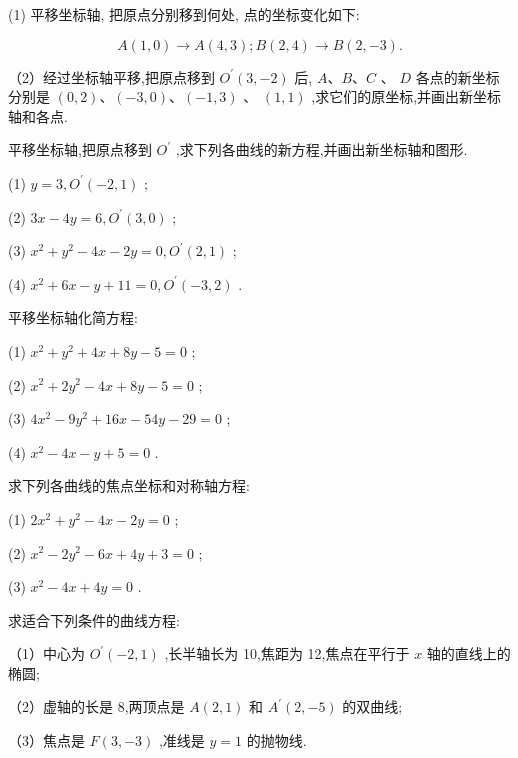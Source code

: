 \documentclass[lang=cn,newtx,10pt,scheme=chinese]{elegantbook}
\begin{document}
\begin{problemset}[习 题 十]

\item (1) 平移坐标轴, 把原点分别移到何处, 点的坐标变化如下:

\[
  A\left( {1,0}\right) \rightarrow A\left( {4,3}\right) ;B\left( {2,4}\right) \rightarrow B\left( {2, - 3}\right) .
\]

（2）经过坐标轴平移,把原点移到 \({O}^{\prime }\left( {3, - 2}\right)\) 后, \(A\text{、}B\text{、}C\) 、 \(D\) 各点的新坐标分别是 \(\left( {0,2}\right) \text{、}\left( {-3,0}\right) \text{、}\left( {-1,3}\right)\) 、 \(\left( {1,1}\right)\) ,求它们的原坐标,并画出新坐标轴和各点.

\item 平移坐标轴,把原点移到 \({O}^{\prime }\) ,求下列各曲线的新方程,并画出新坐标轴和图形.

(1) \(y = 3,{O}^{\prime }\left( {-2,1}\right)\) ;

(2) \({3x} - {4y} = 6,{O}^{\prime }\left( {3,0}\right)\) ;

(3) \({x}^{2} + {y}^{2} - {4x} - {2y} = 0,{O}^{\prime }\left( {2,1}\right)\) ;

(4) \({x}^{2} + {6x} - y + {11} = 0,{O}^{\prime }\left( {-3,2}\right)\) .

\item 平移坐标轴化简方程:

(1) \({x}^{2} + {y}^{2} + {4x} + {8y} - 5 = 0\) ;

(2) \({x}^{2} + 2{y}^{2} - {4x} + {8y} - 5 = 0\) ;

(3) \(4{x}^{2} - 9{y}^{2} + {16x} - {54y} - {29} = 0\) ;

(4) \({x}^{2} - {4x} - y + 5 = 0\) .

\item 求下列各曲线的焦点坐标和对称轴方程:

(1) \(2{x}^{2} + {y}^{2} - {4x} - {2y} = 0\) ;

(2) \({x}^{2} - 2{y}^{2} - {6x} + {4y} + 3 = 0\) ;

(3) \({x}^{2} - {4x} + {4y} = 0\) .

\item 求适合下列条件的曲线方程:

（1）中心为 \({O}^{\prime }\left( {-2,1}\right)\) ,长半轴长为 10,焦距为 12,焦点在平行于 \(x\) 轴的直线上的椭圆;

（2）虚轴的长是 8,两顶点是 \(A\left( {2,1}\right)\) 和 \({A}^{\prime }\left( {2, - 5}\right)\) 的双曲线;

（3）焦点是 \(F\left( {3, - 3}\right)\) ,准线是 \(y = 1\) 的抛物线.

\end{problemset}
\end{document}
